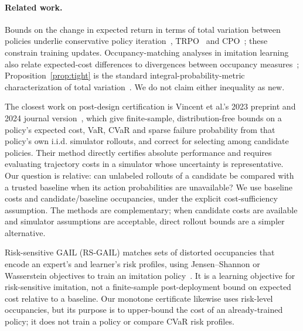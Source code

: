 \documentclass{article}
\begin{document}
\paragraph{Related work.}
Bounds on the change in expected return in terms of total variation between policies underlie conservative policy iteration~\citep{kakade2002cpi}, TRPO~\citep{schulman2015trpo} and CPO~\citep{achiam2017cpo}; these constrain training updates. Occupancy-matching analyses in imitation learning also relate expected-cost differences to divergences between occupancy measures~\citep{ho2016gail}; Proposition~\ref{prop:tight} is the standard integral-probability-metric characterization of total variation~\citep{muller1997ipm}. We do not claim either inequality as new.

The closest work on post-design certification is Vincent et al.'s 2023 preprint and 2024 journal version~\citep{vincent2023guarantees,vincent2024guarantees}, which give finite-sample, distribution-free bounds on a policy's expected cost, VaR, CVaR and sparse failure probability from that policy's own i.i.d. simulator rollouts, and correct for selecting among candidate policies. Their method directly certifies absolute performance and requires evaluating trajectory costs in a simulator whose uncertainty is representative. Our question is relative: can unlabeled rollouts of a candidate be compared with a trusted baseline when its action probabilities are unavailable? We use baseline costs and candidate/baseline occupancies, under the explicit cost-sufficiency assumption. The methods are complementary; when candidate costs are available and simulator assumptions are acceptable, direct rollout bounds are a simpler alternative.

Risk-sensitive GAIL (RS-GAIL) matches sets of distorted occupancies that encode an expert's and learner's risk profiles, using Jensen--Shannon or Wasserstein objectives to train an imitation policy~\citep{lacotte2019rsgail}. It is a learning objective for risk-sensitive imitation, not a finite-sample post-deployment bound on expected cost relative to a baseline. Our monotone certificate likewise uses risk-level occupancies, but its purpose is to upper-bound the cost of an already-trained policy; it does not train a policy or compare CVaR risk profiles.
\end{document}

